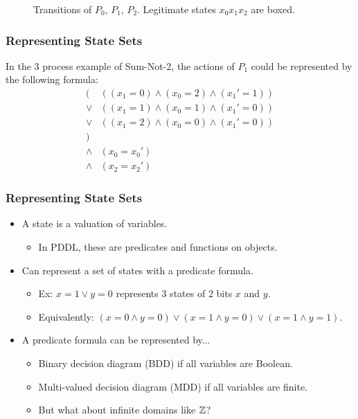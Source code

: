 \documentclass[handout]{beamer}
\begin{document}
\begin{frame}
\begin{figure}
\caption{Transitions of {\color{red!40} $P_0$}, {\color{green!50!black!75} $P_1$}, {\color{blue} $P_2$}. Legitimate states $x_0x_1x_2$ are boxed.}
\end{figure}
\end{frame}

\begin{frame}
\frametitle{Representing State Sets}
In the $3$ process example of Sum-Not-2, the actions of $P_1$ could be represented by the following formula:
\[\begin{array}{rl}
   ( & ((x_1 = 0) \wedge (x_0 = 2) \wedge (x_1' = 1))
\\ \vee & ((x_1 = 1) \wedge (x_0 = 1) \wedge (x_1' = 0))
\\ \vee & ((x_1 = 2) \wedge (x_0 = 0) \wedge (x_1' = 0))
\\ ) &
\\ \wedge & (x_0 = x_0')
\\ \wedge & (x_2 = x_2')
\end{array}\]
\end{frame}

\begin{frame}
\frametitle{Representing State Sets}
\begin{itemize}
\item A state is a valuation of variables.
 \begin{itemize}
 \item In PDDL, these are predicates and functions on objects.
 \end{itemize}
\item Can represent a set of states with a predicate formula.
 \begin{itemize}
 \item Ex: $x=1\vee y=0$ represents $3$ states of $2$ bits $x$ and $y$.
 \item Equivalently: $(x=0\wedge y=0) \vee (x=1\wedge y=0) \vee (x=1\wedge y=1)$.
 \end{itemize}
\item A predicate formula can be represented by...
 \begin{itemize}
 \item Binary decision diagram (BDD) if all variables are Boolean.
 \item Multi-valued decision diagram (MDD) if all variables are finite.
 \item But what about infinite domains like $\mathbb{Z}$?
 \end{itemize}
\end{itemize}
\end{frame}
\end{document}
